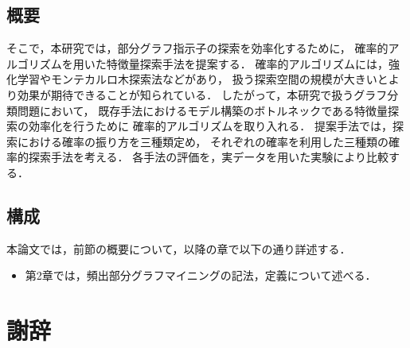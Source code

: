 \documentclass[12pt,fleqn]{jsotsuron}
\begin{document}
\section{概要}
そこで，本研究では，部分グラフ指示子の探索を効率化するために，
確率的アルゴリズムを用いた特徴量探索手法を提案する．
確率的アルゴリズムには，強化学習やモンテカルロ木探索法\cite{MCTS}などがあり，
扱う探索空間の規模が大きいとより効果が期待できることが知られている．
したがって，本研究で扱うグラフ分類問題において，
既存手法におけるモデル構築のボトルネックである特徴量探索の効率化を行うために
確率的アルゴリズムを取り入れる．
提案手法では，探索における確率の振り方を三種類定め，
それぞれの確率を利用した三種類の確率的探索手法を考える．
各手法の評価を，実データを用いた実験により比較する．

\section{構成}
本論文では，前節の概要について，以降の章で以下の通り詳述する．
\begin{itemize}
\item 第2章では，頻出部分グラフマイニングの記法，定義について述べる．
\end{itemize}




\chapter*{謝辞}


\end{document}

